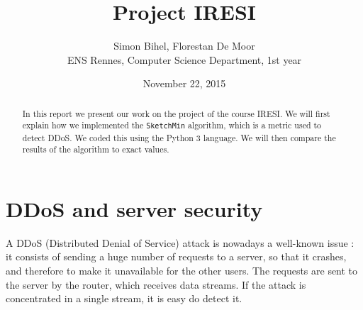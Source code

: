 \documentclass[a4paper]{article}%
\begin{document}
\title{Project IRESI}

\author{Simon Bihel, Florestan De Moor \\ ENS Rennes, Computer Science Department, 1st year}

\date{November 22, 2015}

\maketitle

\begin{abstract}
	In this report we present our work on the project of the course IRESI. We will first explain how we implemented the \texttt{SketchMin} algorithm, which is a metric used to detect DDoS. We coded this using the Python 3 language. We will then compare the results of the algorithm to exact values.
\end{abstract}


\section{DDoS and server security}

A DDoS (Distributed Denial of Service) attack is nowadays a well-known issue : it consists of sending a huge number of requests to a server, so that it crashes, and therefore to make it unavailable for the other users. The requests are sent to the server by the router, which receives data streams. If the attack is concentrated in a single stream, it is easy do detect it.
\end{document}

